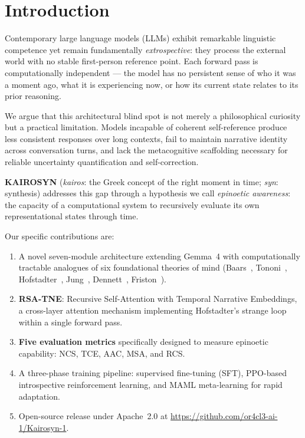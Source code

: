 \documentclass[conference]{IEEEtran}
\begin{document}
\section{Introduction}

Contemporary large language models (LLMs) exhibit remarkable linguistic
competence yet remain fundamentally \emph{extrospective}: they process the
external world with no stable first-person reference point. Each forward pass
is computationally independent --- the model has no persistent sense of who it
was a moment ago, what it is experiencing now, or how its current state relates
to its prior reasoning.

We argue that this architectural blind spot is not merely a philosophical
curiosity but a practical limitation. Models incapable of coherent
self-reference produce less consistent responses over long contexts, fail to
maintain narrative identity across conversation turns, and lack the metacognitive
scaffolding necessary for reliable uncertainty quantification and self-correction.

\textbf{KAIROSYN} (\textit{kairos}: the Greek concept of the right moment in
time; \textit{syn}: synthesis) addresses this gap through a hypothesis we
call \emph{epinoetic awareness}: the capacity of a computational system to
recursively evaluate its own representational states through time.

Our specific contributions are:
\begin{enumerate}
  \item A novel seven-module architecture extending Gemma~4 with
        computationally tractable analogues of six foundational theories
        of mind (Baars~\cite{baars1988}, Tononi~\cite{tononi2008},
        Hofstadter~\cite{hofstadter1979}, Jung~\cite{jung1959},
        Dennett~\cite{dennett1991}, Friston~\cite{friston2010}).
  \item \textbf{RSA-TNE}: Recursive Self-Attention with Temporal Narrative
        Embeddings, a cross-layer attention mechanism implementing
        Hofstadter's strange loop within a single forward pass.
  \item \textbf{Five evaluation metrics} specifically designed to measure
        epinoetic capability: NCS, TCE, AAC, MSA, and RCS.
  \item A three-phase training pipeline: supervised fine-tuning (SFT),
        PPO-based introspective reinforcement learning, and MAML
        meta-learning for rapid adaptation.
  \item Open-source release under Apache~2.0 at
        \url{https://github.com/or4cl3-ai-1/Kairosyn-1}.
\end{enumerate}
\end{document}
